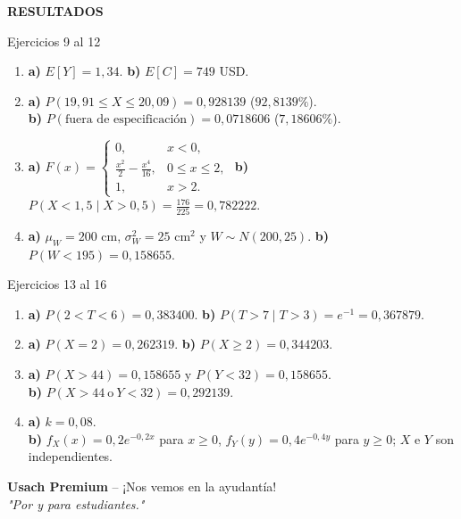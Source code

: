 \documentclass[letterpaper,12pt]{article}
\newenvironment{resultados}{%
    \newpage
    \begin{center}
        \begin{tcolorbox}[
            colback=azulFuerte,
            colframe=azulFuerte,
            colupper=white,
            width=0.8\textwidth,
            center,
            arc=10pt]
            \centering\Large\textbf{RESULTADOS}
        \end{tcolorbox}
    \end{center}
    \small
}{}
\begin{document}
\begin{resultados}
\begin{resultbox}{Ejercicios 9 al 12}
\begin{enumerate}[label=\color{azulFuerte}\bfseries\arabic*.,start=9,leftmargin=*,itemsep=0.65em]
    \item \textbf{a)} $E[Y]=1{,}34$. \quad
          \textbf{b)} $E[C]=749$ USD.

    \item \textbf{a)} $P(19{,}91\leq X\leq 20{,}09)=0{,}928139$ ($92{,}8139\%$). \\
          \textbf{b)} $P(\text{fuera de especificación})=0{,}0718606$ ($7{,}18606\%$).

    \item \textbf{a)} $\displaystyle F(x)=\begin{cases}
            0,&x<0,\\[1mm]
            \frac{x^2}{2}-\frac{x^4}{16},&0\leq x\leq 2,\\[1mm]
            1,&x>2.
          \end{cases}$ \quad
          \textbf{b)} $\displaystyle P(X<1{,}5\mid X>0{,}5)=\frac{176}{225}=0{,}782222$.

    \item \textbf{a)} $\mu_W=200$ cm, $\sigma_W^2=25$ cm$^2$ y $W\sim N(200,25)$. \quad
          \textbf{b)} $P(W<195)=0{,}158655$.
\end{enumerate}
\end{resultbox}

\begin{resultbox}{Ejercicios 13 al 16}
\begin{enumerate}[label=\color{azulFuerte}\bfseries\arabic*.,start=13,leftmargin=*,itemsep=0.65em]
    \item \textbf{a)} $P(2<T<6)=0{,}383400$. \quad
          \textbf{b)} $P(T>7\mid T>3)=e^{-1}=0{,}367879$.

    \item \textbf{a)} $P(X=2)=0{,}262319$. \quad
          \textbf{b)} $P(X\geq 2)=0{,}344203$.

    \item \textbf{a)} $P(X>44)=0{,}158655$ y $P(Y<32)=0{,}158655$. \\
          \textbf{b)} $P(X>44\ \text{o}\ Y<32)=0{,}292139$.

    \item \textbf{a)} $k=0{,}08$. \\
          \textbf{b)} $f_X(x)=0{,}2e^{-0{,}2x}$ para $x\geq0$, $f_Y(y)=0{,}4e^{-0{,}4y}$ para $y\geq0$; $X$ e $Y$ son independientes.
\end{enumerate}
\end{resultbox}

\vspace{0.6cm}
\begin{center}
    \small\textbf{Usach Premium} -- ¡Nos vemos en la ayudantía! \\
    \textit{"Por y para estudiantes."}
\end{center}

\end{resultados}
\end{document}
